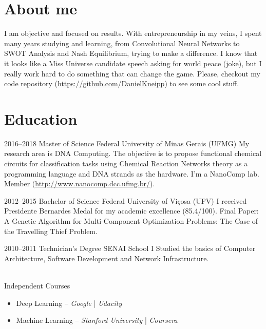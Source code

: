 \documentclass[a4paper]{cv-friggeri-x}
\begin{document}

\section{About me}
I am objective and focused on results. With entrepreneurship in my veins, I spent many years studying and learning, from Convolutional Neural Networks to SWOT Analysis and Nash Equilibrium, trying to make a difference. I know that it looks like a Miss Universe candidate speech asking for world peace (joke), but I really work hard to do something that can change the game. Please, checkout my code repository (\href{https://github.com/DanielKneipp}{https://github.com/DanielKneipp}) to see some cool stuff.


\section{Education}

\begin{entrylist}

\entry
    {2016--2018}
    {Master {\normalfont of Science}}
    {Federal University of Minas Gerais (UFMG)}
    {My research area is DNA Computing. The objective is to propose functional chemical circuits for classification tasks using Chemical Reaction Networks theory as a programming language and DNA strands as the hardware. I'm a NanoComp lab. Member (\href{http://www.nanocomp.dcc.ufmg.br/}{http://www.nanocomp.dcc.ufmg.br/}).}

\entry
    {2012--2015}
    {Bachelor {\normalfont of Science}}
    {Federal University of Vi\c cosa (UFV)}
    {I received Presidente Bernardes Medal for my academic excellence (85.4/100). Final Paper: A Genetic Algorithm for Multi-Component Optimization Problems: The Case of the Travelling Thief Problem.}


\entry
    {2010--2011}
    {Technician's {\normalfont Degree}}
    {SENAI School}
    {I Studied the basics of Computer Architecture, Software Development and Network Infrastructure.}

\entry
    {}
    {\\Independent {\normalfont Courses}}
    {}
    {\begin{itemize}%
        \item Deep Learning -- \textit{Google} | \textit{Udacity}%
        \item Machine Learning -- \textit{Stanford University} | \textit{Coursera}%
    \end{itemize}}


\end{entrylist}
\end{document}
